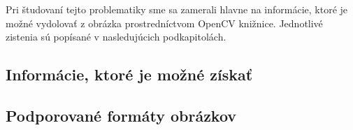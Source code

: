 Pri študovaní tejto problematiky sme sa zamerali hlavne na informácie, ktoré je možné vydolovať z obrázka prostredníctvom OpenCV knižnice. Jednotlivé zistenia sú popísané v nasledujúcich podkapitolách.
\subsection{Informácie, ktoré je možné získať}
\subsection{Podporované formáty obrázkov}